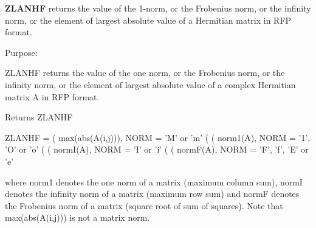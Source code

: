 {\bfseries Z\+L\+A\+N\+H\+F} returns the value of the 1-\/norm, or the Frobenius norm, or the infinity norm, or the element of largest absolute value of a Hermitian matrix in R\+F\+P format. 

 \begin{DoxyParagraph}{Purpose\+: }
\begin{DoxyVerb} ZLANHF  returns the value of the one norm,  or the Frobenius norm, or
 the  infinity norm,  or the  element of  largest absolute value  of a
 complex Hermitian matrix A in RFP format.\end{DoxyVerb}

\end{DoxyParagraph}
\begin{DoxyReturn}{Returns}
Z\+L\+A\+N\+H\+F \begin{DoxyVerb}    ZLANHF = ( max(abs(A(i,j))), NORM = 'M' or 'm'
             (
             ( norm1(A),         NORM = '1', 'O' or 'o'
             (
             ( normI(A),         NORM = 'I' or 'i'
             (
             ( normF(A),         NORM = 'F', 'f', 'E' or 'e'

 where  norm1  denotes the  one norm of a matrix (maximum column sum),
 normI  denotes the  infinity norm  of a matrix  (maximum row sum) and
 normF  denotes the  Frobenius norm of a matrix (square root of sum of
 squares).  Note that  max(abs(A(i,j)))  is not a  matrix norm.\end{DoxyVerb}
 
\end{DoxyReturn}

